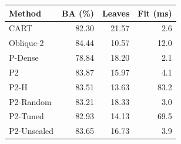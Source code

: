 \begin{tabular}{lrrr}
\toprule
Method & BA (\%) & Leaves & Fit (ms) \\
\midrule
CART & 82.30 & 21.57 & 2.6 \\
Oblique-2 & 84.44 & 10.57 & 12.0 \\
P-Dense & 78.84 & 18.20 & 2.1 \\
P2 & 83.87 & 15.97 & 4.1 \\
P2-H & 83.51 & 13.63 & 83.2 \\
P2-Random & 83.21 & 18.33 & 3.0 \\
P2-Tuned & 82.93 & 14.13 & 69.5 \\
P2-Unscaled & 83.65 & 16.73 & 3.9 \\
\bottomrule
\end{tabular}
